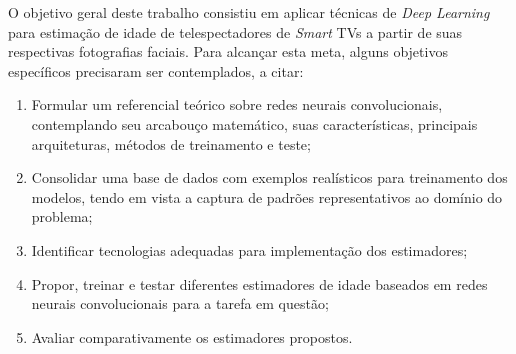 O objetivo geral deste trabalho consistiu em aplicar técnicas de \emph{Deep Learning} para estimação de idade de telespectadores de  \emph{Smart} TVs a partir de suas respectivas fotografias faciais. Para alcançar esta meta, alguns objetivos específicos precisaram ser contemplados, a citar:

\begin{enumerate}
     \item Formular um referencial teórico sobre redes neurais convolucionais, contemplando seu arcabouço matemático, suas características, principais arquiteturas, métodos de treinamento e teste;
     \item Consolidar uma base de dados com exemplos realísticos para treinamento dos modelos, tendo em vista a captura de padrões representativos ao domínio do problema;
     \item Identificar tecnologias adequadas para implementação dos estimadores;
     \item Propor, treinar e testar diferentes estimadores de idade baseados em redes neurais convolucionais para a tarefa em questão;
     \item Avaliar comparativamente os estimadores propostos.
\end{enumerate}
